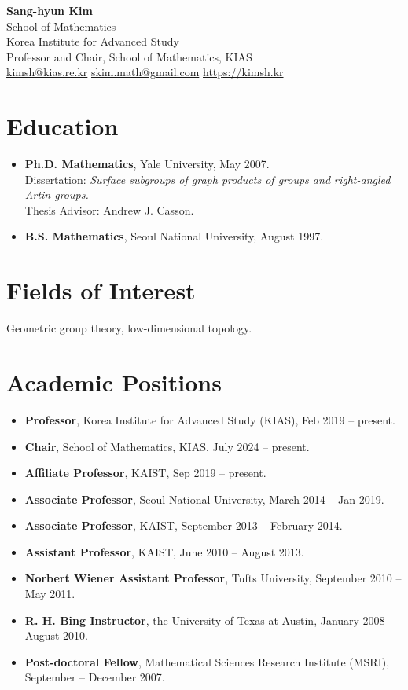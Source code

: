 \documentclass[11pt,a4paper]{article}
\begin{document}
\begin{center}
    {\Huge \textbf{Sang-hyun Kim}} \\ \vspace{0.3cm}
    School of Mathematics \\
    Korea Institute for Advanced Study \\
    Professor and Chair, School of Mathematics, KIAS \\
    \href{mailto:kimsh@kias.re.kr}{kimsh@kias.re.kr} \quad \href{mailto:skim.math@gmail.com}{skim.math@gmail.com} \quad \href{https://kimsh.kr}{https://kimsh.kr}
\end{center}

\vspace{0.5cm}

\section*{Education}
\begin{itemize}[leftmargin=1.5em]
    \item \textbf{Ph.D. Mathematics}, Yale University, May 2007. \\
    Dissertation: \textit{Surface subgroups of graph products of groups and right-angled Artin groups.} \\
    Thesis Advisor: Andrew J. Casson.
    \item \textbf{B.S. Mathematics}, Seoul National University, August 1997.
\end{itemize}

\section*{Fields of Interest}
Geometric group theory, low-dimensional topology.

\section*{Academic Positions}
\begin{itemize}[leftmargin=1.5em]
    \item \textbf{Professor}, Korea Institute for Advanced Study (KIAS), Feb 2019 -- present.
    \item \textbf{Chair}, School of Mathematics, KIAS, July 2024 -- present.
    \item \textbf{Affiliate Professor}, KAIST, Sep 2019 -- present.
    \item \textbf{Associate Professor}, Seoul National University, March 2014 -- Jan 2019.
    \item \textbf{Associate Professor}, KAIST, September 2013 -- February 2014.
    \item \textbf{Assistant Professor}, KAIST, June 2010 -- August 2013.
    \item \textbf{Norbert Wiener Assistant Professor}, Tufts University, September 2010 -- May 2011.
    \item \textbf{R. H. Bing Instructor}, the University of Texas at Austin, January 2008 -- August 2010.
    \item \textbf{Post-doctoral Fellow}, Mathematical Sciences Research Institute (MSRI), September -- December 2007.
\end{itemize}
\end{document}
